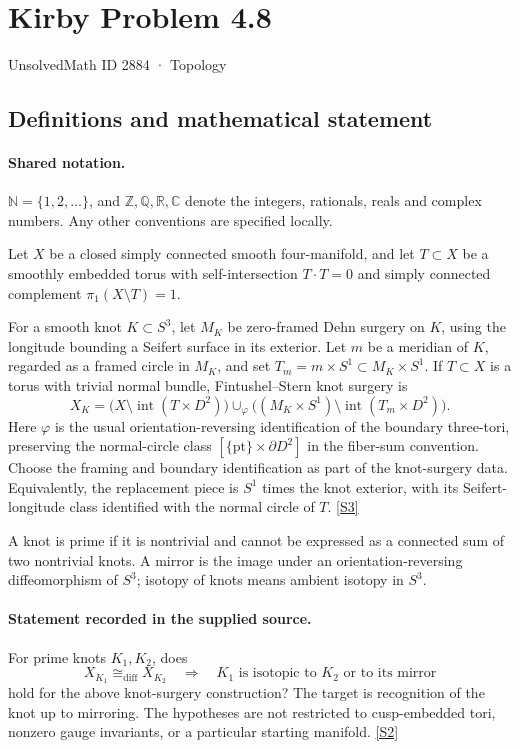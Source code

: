 \documentclass[11pt]{article}
\newcommand{\sref}[2]{\hyperlink{source:#1:#2}{[S#2]}}
\begin{document}
\setcounter{section}{2883}
\section{Kirby Problem 4.8}\label{2884}
{\small\sffamily UnsolvedMath ID 2884 · Topology}
\subsection{Definitions and mathematical statement}

\paragraph{Shared notation.}$\mathbb N=\{1,2,\ldots\}$, and $\mathbb Z,\mathbb Q,\mathbb R,\mathbb C$ denote the integers, rationals, reals and complex numbers. Any other conventions are specified locally.


Let $X$ be a closed simply connected smooth four-manifold, and let $T\subset X$ be a smoothly embedded torus with self-intersection $T\cdot T=0$ and simply connected complement $\pi_1(X\setminus T)=1$.

For a smooth knot $K\subset S^3$, let $M_K$ be zero-framed Dehn surgery on $K$, using the longitude bounding a Seifert surface in its exterior. Let $m$ be a meridian of $K$, regarded as a framed circle in $M_K$, and set $T_m=m\times S^1\subset M_K\times S^1$. If $T\subset X$ is a torus with trivial normal bundle, Fintushel--Stern knot surgery is
\[
X_K=\bigl(X\setminus\operatorname{int}(T\times D^2)\bigr)
\cup_\varphi\bigl((M_K\times S^1)\setminus\operatorname{int}(T_m\times D^2)\bigr).
\]
Here $\varphi$ is the usual orientation-reversing identification of the boundary three-tori, preserving the normal-circle class $[\{\mathrm{pt}\}\times\partial D^2]$ in the fiber-sum convention. Choose the framing and boundary identification as part of the knot-surgery data. Equivalently, the replacement piece is $S^1$ times the knot exterior, with its Seifert-longitude class identified with the normal circle of $T$. \sref{2884}{3}

A knot is prime if it is nontrivial and cannot be expressed as a connected sum of two nontrivial knots. A mirror is the image under an orientation-reversing diffeomorphism of $S^3$; isotopy of knots means ambient isotopy in $S^3$.
\paragraph{Statement recorded in the supplied source.}
For prime knots $K_1,K_2$, does
\[
 X_{K_1}\cong_{\mathrm{diff}}X_{K_2}
 \quad\Longrightarrow\quad
 K_1\text{ is isotopic to }K_2\text{ or to its mirror}
\]
hold for the above knot-surgery construction? The target is recognition of the knot up to mirroring. The hypotheses are not restricted to cusp-embedded tori, nonzero gauge invariants, or a particular starting manifold. \sref{2884}{2}
\end{document}
